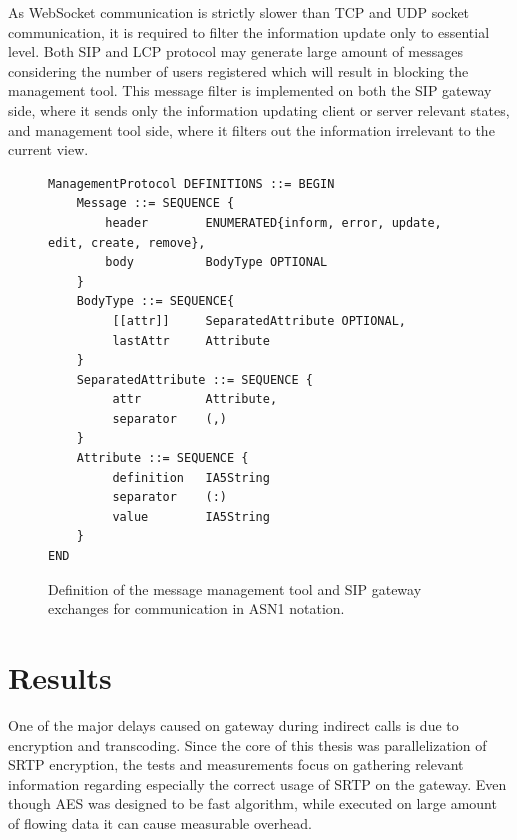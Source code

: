 As WebSocket communication is strictly slower than TCP and UDP socket
communication, it is required to filter the information update only to essential
level. Both SIP and LCP protocol may generate large amount of messages 
considering the number of users registered which will result in blocking the
management tool. This message filter is implemented on both the SIP gateway 
side, where it sends only the information updating client or server relevant 
states, and management tool side, where it filters out the information 
irrelevant to the current view.

\vspace{1em}

\begin{figure}[H]
\centering
\begin{verbatim}
ManagementProtocol DEFINITIONS ::= BEGIN
    Message ::= SEQUENCE {
        header        ENUMERATED{inform, error, update, edit, create, remove},
        body          BodyType OPTIONAL
    }
    BodyType ::= SEQUENCE{
         [[attr]]     SeparatedAttribute OPTIONAL,
         lastAttr     Attribute           
    }
    SeparatedAttribute ::= SEQUENCE {
         attr         Attribute,
         separator    (,)
    }
    Attribute ::= SEQUENCE {
         definition   IA5String
         separator    (:)
         value        IA5String
    }
END
\end{verbatim}
\vspace{-1em}
\caption[Management tool message definition]{Definition of the message 
management tool and SIP gateway exchanges for communication in ASN1 notation.}
\label{tool-msg}
\end{figure}




\chapter{Results}\label{chapter:results}
One of the major delays caused on gateway during indirect calls is due to
encryption and transcoding. Since the core of this thesis was parallelization
of SRTP encryption, the tests and measurements focus on gathering relevant
information regarding especially the correct usage of SRTP on the gateway. Even
though AES was designed to be fast algorithm, while executed on large amount of
flowing data it can cause measurable overhead.

